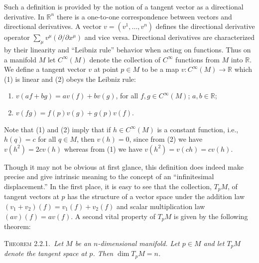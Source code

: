 Such a definition is provided by the notion of a tangent vector as a directional
derivative.  In \(\mathbb{R}^n\) there is a one-to-one correspondence between
vectors and directional derivatives.  A vector \(v=(v^1,\ldots,v^n)\) defines the
directional derivative operator \(\sum_\mu v^\mu(\partial/\partial x^\mu)\) and
vice versa.  Directional derivatives are characterized by their linearity and
``Leibniz rule'' behavior when acting on functions.  Thus on a manifold \(M\) let
\(C^\infty(M)\) denote the collection of \(C^\infty\) functions from \(M\) into
\(\mathbb{R}\).  We define a tangent vector \(v\) at point \(p\in M\) to be a map
\(v:C^\infty(M)\to\mathbb{R}\) which (1) is linear and (2) obeys the Leibniz
rule:
\begin{enumerate}[label=(\arabic*)]
  \item \(v(af+bg)=av(f)+bv(g)\), for all \(f,g\in C^\infty(M)\);
    \(a,b\in\mathbb{R}\);
  \item \(v(fg)=f(p)v(g)+g(p)v(f)\).
\end{enumerate}
Note that (1) and (2) imply that if \(h\in C^\infty(M)\) is a constant function,
i.e., \(h(q)=c\) for all \(q\in M\), then \(v(h)=0\), since from (2) we have
\(v(h^2)=2cv(h)\) whereas from (1) we have \(v(h^2)=v(ch)=cv(h)\).

Though it may not be obvious at first glance, this definition does indeed make
precise and give intrinsic meaning to the concept of an ``infinitesimal
displacement.''  In the first place, it is easy to see that the collection, \(T_pM\),
of tangent vectors at \(p\) has the structure of a vector space under the addition
law \((v_1+v_2)(f)=v_1(f)+v_2(f)\) and scalar multiplication law
\((av)(f)=av(f)\).  A second vital property of \(T_pM\) is given by the following
theorem:

\medskip
\makeatletter{}\makeatother
{}\label{thm:2.2.1}
\noindent\textsc{Theorem 2.2.1.}\ \emph{Let \(M\) be an \(n\)-dimensional
manifold.  Let \(p\in M\) and let \(T_pM\) denote the tangent space at \(p\).
Then \(\dim T_pM=n\).}


